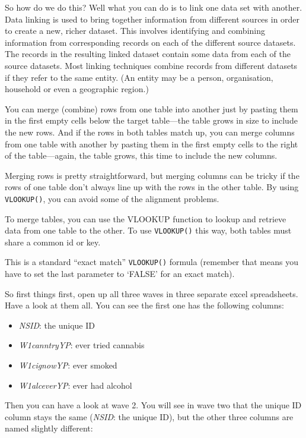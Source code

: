 \documentclass[
]{book}
\providecommand{\tightlist}{%
  \setlength{\itemsep}{0pt}\setlength{\parskip}{0pt}}
\begin{document}
So how do we do this? Well what you can do is to link one data set with another. Data linking is used to bring together information from different sources in order to create a new, richer dataset. This involves identifying and combining information from corresponding records on each of the different source datasets. The records in the resulting linked dataset contain some data from each of the source datasets. Most linking techniques combine records from different datasets if they refer to the same entity. (An entity may be a person, organisation, household or even a geographic region.)

You can merge (combine) rows from one table into another just by pasting them in the first empty cells below the target table---the table grows in size to include the new rows. And if the rows in both tables match up, you can merge columns from one table with another by pasting them in the first empty cells to the right of the table---again, the table grows, this time to include the new columns.

Merging rows is pretty straightforward, but merging columns can be tricky if the rows of one table don't always line up with the rows in the other table. By using \texttt{VLOOKUP()}, you can avoid some of the alignment problems.

To merge tables, you can use the VLOOKUP function to lookup and retrieve data from one table to the other. To use \texttt{VLOOKUP()} this way, both tables must share a common id or key.

This is a standard ``exact match'' \texttt{VLOOKUP()} formula (remember that means you have to set the last parameter to `FALSE' for an exact match).

So first things first, open up all three waves in three separate excel spreadsheets. Have a look at them all. You can see the first one has the following columns:

\begin{itemize}
\tightlist
\item
  \emph{NSID}: the unique ID
\item
  \emph{W1canntryYP}: ever tried cannabis\\
\item
  \emph{W1cignowYP}: ever smoked
\item
  \emph{W1alceverYP}: ever had alcohol
\end{itemize}

Then you can have a look at wave 2. You will see in wave two that the unique ID column stays the same (\emph{NSID}: the unique ID), but the other three columns are named slightly different:
\end{document}
